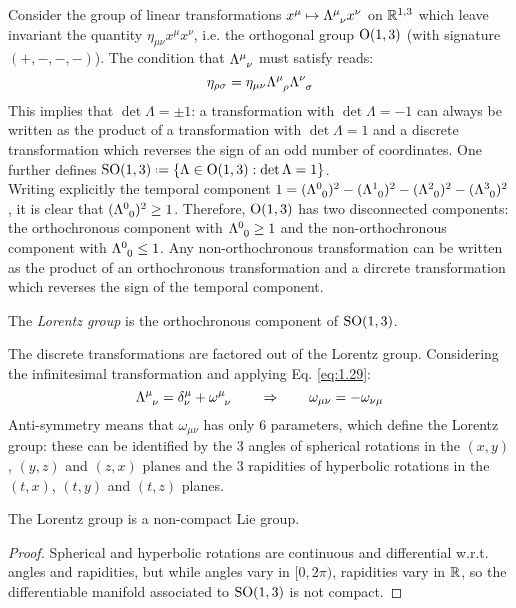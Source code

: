 Consider the group of linear transformations $ x^\mu \mapsto \tensor{\Lambda}{^\mu_\nu} x^\nu $ on $ \mathbb{R}^{1,3} $ which leave invariant the quantity $ \eta_{\mu \nu} x^\mu x^\nu $, i.e. the orthogonal group $ \mathrm{O}(1,3) $ (with signature $ (+,-,-,-) $). The condition that $ \tensor{\Lambda}{^\mu_\nu} $ must satisfy reads:
\begin{equation}
  \eta_{\rho \sigma} = \eta_{\mu \nu} \tensor{\Lambda}{^\mu_\rho} \tensor{\Lambda}{^\nu_\sigma}
  \label{eq:1.29}
\end{equation}
This implies that $ \det \Lambda = \pm 1 $: a transformation with $ \det \Lambda = -1 $ can always be written as the product of a transformation with $ \det \Lambda = 1 $ and a discrete transformation which reverses the sign of an odd number of coordinates. One further defines $ \SOn{1,3} \defeq \{\Lambda \in \On{1,3} : \det \Lambda = 1\} $.\\
Writing explicitly the temporal component $ 1 = (\tensor{\Lambda}{^0_0})^2 - (\tensor{\Lambda}{^1_0})^2 - (\tensor{\Lambda}{^2_0})^2 - (\tensor{\Lambda}{^3_0})^2 $, it is clear that $ (\tensor{\Lambda}{^0_0})^2 \ge 1 $. Therefore, $ \mathrm{O}(1,3) $ has two disconnected components: the orthochronous component with $ \tensor{\Lambda}{^0_0} \ge 1 $ and the non-orthochronous component with $ \tensor{\Lambda}{^0_0} \le 1 $. Any non-orthochronous transformation can be written as the product of an orthochronous transformation and a dircrete transformation which reverses the sign of the temporal component.

\begin{definition}
  The \textit{Lorentz group} is the orthochronous component of $ \mathrm{SO}(1,3) $.
\end{definition}

The discrete transformations are factored out of the Lorentz group. Considering the infinitesimal transformation and applying Eq. \ref{eq:1.29}:
\begin{equation*}
  \tensor{\Lambda}{^\mu_\nu} = \delta^\mu_\nu + \tensor{\omega}{^\mu_\nu}
  \qquad \Rightarrow \qquad
  \omega_{\mu \nu} = - \omega_{\nu \mu}
\end{equation*}
Anti-symmetry means that $ \omega_{\mu \nu} $ has only 6 parameters, which define the Lorentz group: these can be identified by the 3 angles of spherical rotations in the $ (x,y) $, $ (y,z) $ and $ (z,x) $ planes and the 3 rapidities of hyperbolic rotations in the $ (t,x) $, $ (t,y) $ and $ (t,z) $ planes.

\begin{proposition}
  The Lorentz group is a non-compact Lie group.
\end{proposition}
\begin{proof}
  Spherical and hyperbolic rotations are continuous and differential w.r.t. angles and rapidities, but while angles vary in $ [0, 2\pi) $, rapidities vary in $ \mathbb{R} $, so the differentiable manifold associated to $ \mathrm{SO}(1,3) $ is not compact.
\end{proof}

